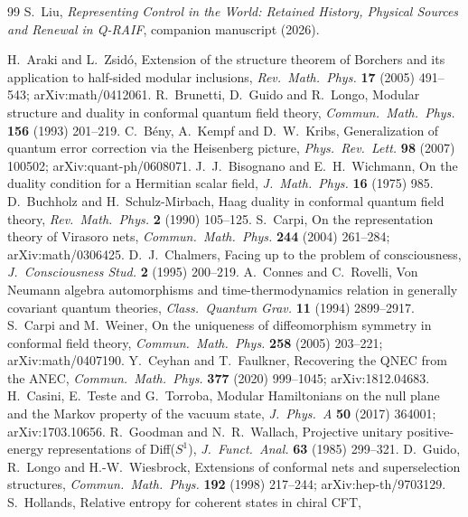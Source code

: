 \documentclass[12pt]{article}
\theoremstyle{definition}
\theoremstyle{remark}
\begin{document}
\begin{thebibliography}{99}
 S.~Liu, \emph{Representing Control in the World: Retained History, Physical Sources and Renewal in Q-RAIF}, companion manuscript (2026).
\raggedright

 H.~Araki and L.~Zsid\'o, Extension of the structure theorem of Borchers
and its application to half-sided modular inclusions, \emph{Rev.\ Math.\ Phys.}
\textbf{17} (2005) 491--543; arXiv:math/0412061.
 R.~Brunetti, D.~Guido and R.~Longo, Modular structure and duality in
conformal quantum field theory, \emph{Commun.\ Math.\ Phys.} \textbf{156} (1993) 201--219.
 C.~B\'eny, A.~Kempf and D.~W.~Kribs, Generalization of quantum error
correction via the Heisenberg picture, \emph{Phys.\ Rev.\ Lett.} \textbf{98} (2007)
100502; arXiv:quant-ph/0608071.
 J.~J.~Bisognano and E.~H.~Wichmann, On the duality condition for a Hermitian
scalar field, \emph{J.\ Math.\ Phys.} \textbf{16} (1975) 985.
 D.~Buchholz and H.~Schulz-Mirbach, Haag duality in conformal quantum field theory, \emph{Rev.\ Math.\ Phys.} \textbf{2} (1990) 105--125.
 S.~Carpi, On the representation theory of Virasoro nets,
\emph{Commun.\ Math.\ Phys.} \textbf{244} (2004) 261--284; arXiv:math/0306425.
 D.~J.~Chalmers, Facing up to the problem of consciousness, \emph{J.\ Consciousness Stud.} \textbf{2} (1995) 200--219.
 A.~Connes and C.~Rovelli, Von Neumann algebra automorphisms and time-thermodynamics relation in generally covariant quantum theories,
\emph{Class.\ Quantum Grav.} \textbf{11} (1994) 2899--2917.
 S.~Carpi and M.~Weiner, On the uniqueness of diffeomorphism symmetry in
conformal field theory, \emph{Commun.\ Math.\ Phys.} \textbf{258} (2005) 203--221; arXiv:math/0407190.
 Y.~Ceyhan and T.~Faulkner, Recovering the QNEC from the ANEC,
\emph{Commun.\ Math.\ Phys.} \textbf{377} (2020) 999--1045; arXiv:1812.04683.
 H.~Casini, E.~Teste and G.~Torroba, Modular Hamiltonians on the null
plane and the Markov property of the vacuum state, \emph{J.\ Phys.\ A} \textbf{50}
(2017) 364001; arXiv:1703.10656.
 R.~Goodman and N.~R.~Wallach, Projective unitary positive-energy representations of Diff(\(S^1\)), \emph{J.\ Funct.\ Anal.} \textbf{63} (1985) 299--321.
 D.~Guido, R.~Longo and H.-W.~Wiesbrock, Extensions of conformal nets and
superselection structures, \emph{Commun.\ Math.\ Phys.} \textbf{192} (1998) 217--244;
arXiv:hep-th/9703129.
 S.~Hollands, Relative entropy for coherent states in chiral CFT,

\end{thebibliography}
\end{document}
